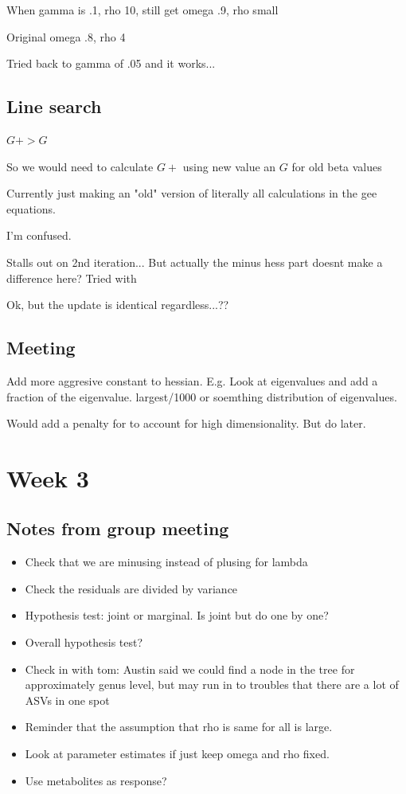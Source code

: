 \documentclass[10pt]{article}
\theoremstyle{definition}
\begin{document}
When gamma is .1, rho 10, still get omega .9, rho small

Original omega .8, rho 4

Tried back to gamma of .05 and it works...


\subsection{Line search}

$G+ > G$

So we would need to calculate $G+$ using new value an $G$ for old beta values

Currently just making an "old" version of literally all calculations in the gee equations.

I'm confused.

Stalls out on 2nd iteration...
But actually the minus hess part doesnt make a difference here?
Tried with

Ok, but the update is identical regardless...??

\subsection{Meeting}

Add more aggresive constant to hessian.
E.g. Look at eigenvalues and add a fraction of the eigenvalue. largest/1000 or soemthing
distribution of eigenvalues.


Would add a penalty for to account for high dimensionality.
But do later.


\section{Week 3}
\subsection{Notes from group meeting}


\begin{itemize}
  \item Check that we are minusing instead of plusing for lambda
  \item Check the residuals are divided by variance
  \item Hypothesis test: joint or marginal. Is joint but do one by one?
  \item Overall hypothesis test?
  \item Check in with tom: Austin said we could find a node in the tree for approximately genus level, but may run in to troubles that there are a lot of ASVs in one spot
  \item Reminder that the assumption that rho is same for all is large.
  \item Look at parameter estimates if just keep omega and rho fixed.
  \item Use metabolites as response?
\end{itemize}
\end{document}
